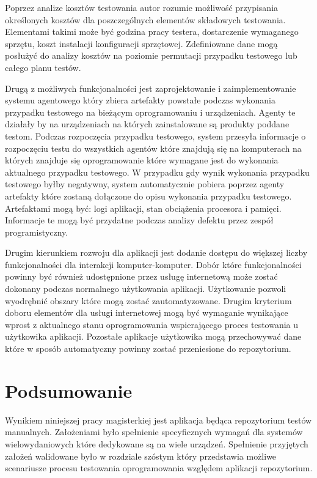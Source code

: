 Poprzez analize kosztów testowania autor rozumie możliwość przypisania określonych kosztów dla poszczególnych elementów składowych testowania. Elementami takimi może być godzina pracy testera, dostarczenie wymaganego sprzętu, koszt instalacji konfiguracji sprzętowej. Zdefiniowane dane mogą posłużyć do analizy kosztów na poziomie permutacji przypadku testowego lub całego planu testów.

Drugą z możliwych funkcjonalności jest zaprojektowanie i zaimplementowanie systemu agentowego który zbiera artefakty powstałe podczas wykonania przypadku testowego na bieżącym oprogramowaniu i urządzeniach. Agenty te działały by na urządzeniach na których zainstalowane są produkty poddane testom. Podczas rozpoczęcia przypadku testowego, system przesyła informacje o rozpoczęciu testu do wszystkich agentów które znajdują się na komputerach na których znajduje się oprogramowanie które wymagane jest do wykonania aktualnego przypadku testowego. W przypadku gdy wynik wykonania przypadku testowego byłby negatywny, system automatycznie pobiera poprzez agenty artefakty które zostaną dołączone do opisu wykonania przypadku testowego. Artefaktami mogą być: logi aplikacji, stan obciążenia procesora i pamięci. Informacje te mogą być przydatne podczas analizy defektu przez zespół programistyczny.

Drugim kierunkiem rozwoju dla aplikacji jest dodanie dostępu do większej liczby funkcjonalności dla interakcji komputer-komputer. Dobór które funkcjonalności powinny być również udostępnione przez usługę internetową może zostać dokonany podczas normalnego użytkowania aplikacji. Użytkowanie pozwoli wyodrębnić obszary które mogą zostać zautomatyzowane. Drugim kryterium doboru elementów dla usługi internetowej mogą być wymaganie wynikające wprost z aktualnego stanu oprogramowania wspierającego proces testowania u użytkowika aplikacji. Pozostałe aplikacje użytkowika mogą przechowywać dane które w sposób automatyczny powinny zostać przeniesione do repozytorium.



\section{Podsumowanie}

Wynikiem niniejszej pracy magisterkiej jest aplikacja będąca repozytorium testów manualnych. Założeniami było spełnienie specyficznych wymagań dla systemów wielowydaniowych które dedykowane są na wiele urządzeń. Spełnienie przyjętych założeń walidowane było w rozdziale szóstym który przedstawia możliwe scenariusze procesu testowania oprogramowania względem aplikacji repozytorium.

